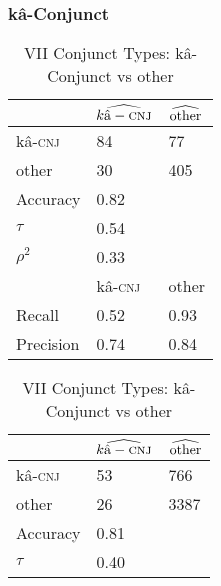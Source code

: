 \FloatBarrier

\subsubsection{kâ-Conjunct}

\begin{table}[H]
  \begin{floatrow}[2]
    \makegapedcells
    \ttabbox%
    {                \begin{tabular}{lll}
                \toprule
                     & $\widehat{k\textup{â}-\textsc{cnj}}$ & $\widehat{\textup{other}}$ \\
                \midrule
kâ-\textsc{cnj}   & 84                & 77                    \\
other             & 30                & 405                    \\
                     \midrule
                     \midrule
Accuracy          & 0.82               &                       \\
$\tau$            & 0.54               &                       \\
$\rho^{2}$        & 0.33               &                       \\
                     \midrule
                     \midrule
                     & kâ-\textsc{cnj}           & other           \\
Recall               & 0.52               & 0.93                  \\
Precision            & 0.74               & 0.84 \\
                \bottomrule
                \end{tabular}}
    {\caption{VII Conjunct Types: kâ-Conjunct vs other}
      \label{viiivcms}}
    \hfill%
    \ttabbox%
    {                \begin{tabular}{lll}
                \toprule
                     & $\widehat{k\textup{â}-\textsc{cnj}}$ & $\widehat{\textup{other}}$ \\
                \midrule
kâ-\textsc{cnj}      & 53                & 766                    \\
other                & 26                 & 3387                    \\
                     \midrule
                     \midrule
Accuracy             & 0.81               &                       \\
$\tau$               & 0.40               &                       \\

\end{tabular}}
\end{floatrow}
\end{table}
